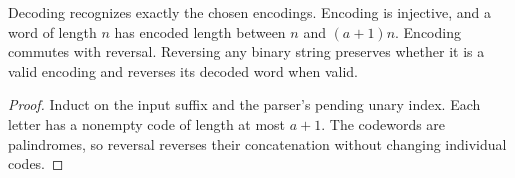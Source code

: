 \begin{lemma}
  \label{lem:finite-alphabet-code}
  \leanok
  Decoding recognizes exactly the chosen encodings. Encoding is injective,
  and a word of length $n$ has encoded length between $n$ and $(a+1)n$.
  Encoding commutes with reversal. Reversing any binary string preserves
  whether it is a valid encoding and reverses its decoded word when valid.
\end{lemma}
\begin{proof}
  \leanok
  Induct on the input suffix and the parser's pending unary index. Each letter
  has a nonempty code of length at most $a+1$. The codewords are palindromes,
  so reversal reverses their concatenation without changing individual codes.
\end{proof}

